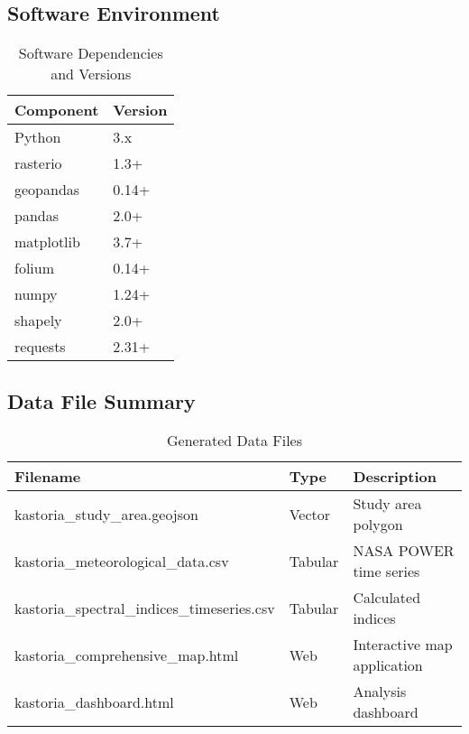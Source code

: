 \documentclass[a4paper,12pt]{article}
\begin{document}
\subsection{Software Environment}

\begin{table}[H]
    \centering
    \caption{Software Dependencies and Versions}
    \begin{tabular}{@{}ll@{}}
        \toprule
        Component  & Version \\
        \midrule
        Python     & 3.x     \\
        rasterio   & 1.3+    \\
        geopandas  & 0.14+   \\
        pandas     & 2.0+    \\
        matplotlib & 3.7+    \\
        folium     & 0.14+   \\
        numpy      & 1.24+   \\
        shapely    & 2.0+    \\
        requests   & 2.31+   \\
        \bottomrule
    \end{tabular}
\end{table}

\subsection{Data File Summary}

\begin{table}[H]
    \centering
    \caption{Generated Data Files}
    \begin{tabular}{@{}lll@{}}
        \toprule
        Filename                                    & Type    & Description                 \\
        \midrule
        kastoria\_study\_area.geojson               & Vector  & Study area polygon          \\
        kastoria\_meteorological\_data.csv          & Tabular & NASA POWER time series      \\
        kastoria\_spectral\_indices\_timeseries.csv & Tabular & Calculated indices          \\
        kastoria\_comprehensive\_map.html           & Web     & Interactive map application \\
        kastoria\_dashboard.html                    & Web     & Analysis dashboard          \\
        \bottomrule
    \end{tabular}
\end{table}
\end{document}
